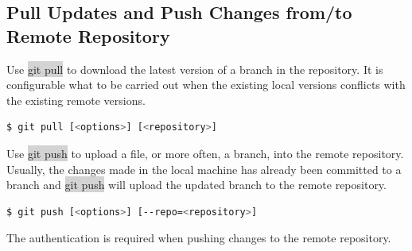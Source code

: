 \documentclass[a4paper]{article}
\begin{document}
\subsection{Pull Updates and Push Changes from/to Remote Repository}

Use \colorbox{lightgray}{git pull} to download the latest version of a branch in the repository. It is configurable what to be carried out when the existing local versions conflicts with the existing remote versions.
\begin{lstlisting}[backgroundcolor = \color{lightgray},language=bash]
  $ git pull [<options>] [<repository>]
\end{lstlisting}

Use \colorbox{lightgray}{git push} to upload a file, or more often, a branch, into the remote repository. Usually, the changes made in the local machine has already been committed to a branch and \colorbox{lightgray}{git push} will upload the updated branch to the remote repository.
\begin{lstlisting}[backgroundcolor = \color{lightgray},language=bash]
  $ git push [<options>] [--repo=<repository>]
\end{lstlisting}
The authentication is required when pushing changes to the remote repository.



\end{document}

